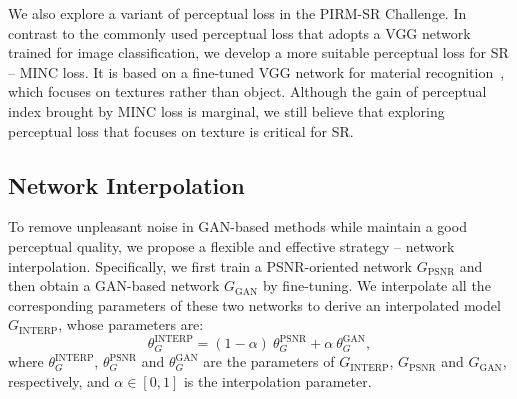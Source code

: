 \documentclass[runningheads]{llncs}
\begin{document}
We also explore a variant of perceptual loss in the PIRM-SR Challenge. 
%
In contrast to the commonly used perceptual loss that adopts a VGG network trained for image classification, we develop 
a more suitable perceptual loss for SR -- MINC loss.
%
It is based on a fine-tuned VGG network for material recognition~\cite{bell2015material}, which focuses on textures 
rather than object.
%
Although the gain of perceptual index brought by MINC loss is marginal, we still believe that exploring perceptual loss 
that focuses on texture is critical for SR.





\subsection{Network Interpolation}
\label{subsec:net_interp}

To remove unpleasant noise in GAN-based methods while maintain a good perceptual quality, we propose a flexible  
and effective strategy -- network interpolation. Specifically, we first train a PSNR-oriented network $G_{\text{PSNR}}$ 
and then obtain a GAN-based network $G_{\text{GAN}}$ by fine-tuning. We interpolate all the corresponding parameters of 
these two networks to derive an interpolated model $G_\text{INTERP}$, whose parameters are:
%
\begin{equation}
\theta_G^{\text{INTERP}} = (1-\alpha) \ \theta_G^{\text{PSNR}} + \alpha \ \theta_G^{\text{GAN}},
\end{equation}
where $\theta_G^{\text{INTERP}}$, $\theta_G^{\text{PSNR}}$ and $\theta_G^{\text{GAN}}$ are the parameters of  
$G_\text{INTERP}$, $G_\text{PSNR}$ and $G_\text{GAN}$, respectively, and $\alpha \in [0,1]$ is the interpolation 
parameter.
\end{document}
